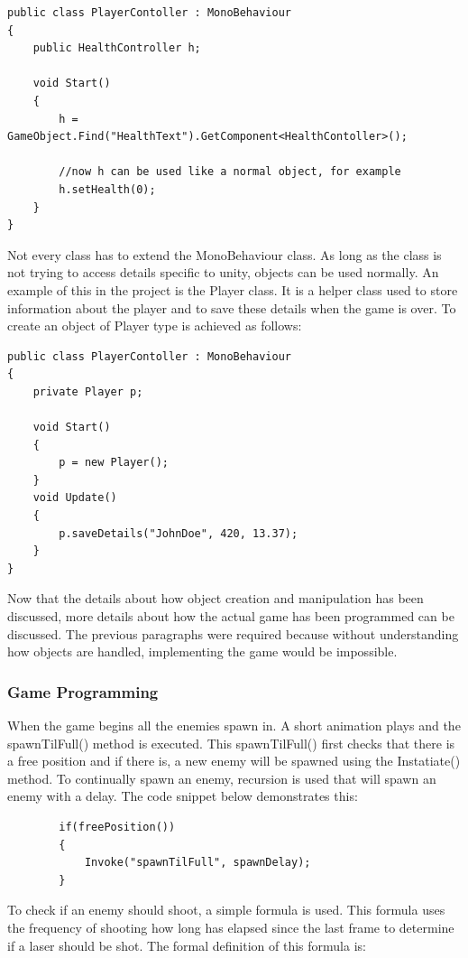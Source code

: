 \documentclass[12pt]{article}
\begin{document}
\begin{lstlisting}
public class PlayerContoller : MonoBehaviour
{
	public HealthController h;
	
	void Start()
	{
		h = GameObject.Find("HealthText").GetComponent<HealthContoller>();
		
		//now h can be used like a normal object, for example
		h.setHealth(0);
	}
}
\end{lstlisting}

Not every class has to extend the MonoBehaviour class. As long as the class is not trying to access details specific to unity, objects can be used normally. An example of this in the project is the Player class. It is a helper class used to store information about the player and to save these details when the game is over. To create an object of Player type is achieved as follows: 

\begin{lstlisting}
public class PlayerContoller : MonoBehaviour
{
	private Player p;
	
	void Start()
	{
		p = new Player();
	}
	void Update()
	{
		p.saveDetails("JohnDoe", 420, 13.37);
	}
}
\end{lstlisting}

Now that the details about how object creation and manipulation has been discussed, more details about how the actual game has been programmed can be discussed. The previous paragraphs were required because without understanding how objects are handled, implementing the game would be impossible. 

\subsubsection{Game Programming}
When the game begins all the enemies spawn in. A short animation plays and the spawnTilFull() method is executed. This spawnTilFull() first checks that there is a free position and if there is, a new enemy will be spawned using the Instatiate() method. To continually spawn an enemy, recursion is used that will spawn an enemy with a delay. The code snippet below demonstrates this:

\begin{lstlisting}
		if(freePosition())
		{
			Invoke("spawnTilFull", spawnDelay);
		}
\end{lstlisting}

To check if an enemy should shoot, a simple formula is used. This formula uses the frequency of shooting how long has elapsed since the last frame to determine if a laser should be shot. The formal definition of this formula is: 
\end{document}

